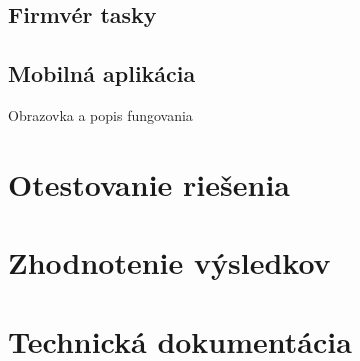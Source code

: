 \documentclass[12pt, a4paper]{article}
\begin{document}
\subsection{Firmvér tasky}


\subsection{Mobilná aplikácia}
Obrazovka a popis fungovania

\section{Otestovanie riešenia}


\section{Zhodnotenie výsledkov}

\printbibliography[title={Literatúra}]
\newpage

\section{Technická dokumentácia}
\end{document}
